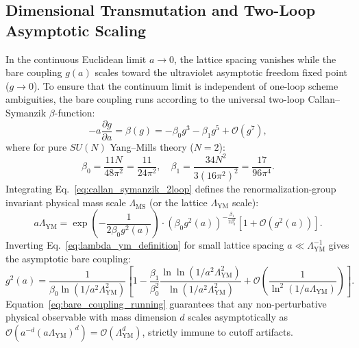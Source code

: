 \documentclass[11pt,reqno]{article}
\begin{document}
\subsection{Dimensional Transmutation and Two-Loop Asymptotic Scaling}
In the continuous Euclidean limit $a \to 0$, the lattice spacing vanishes while the bare coupling $g(a)$ scales toward the ultraviolet asymptotic freedom fixed point ($g \to 0$).
To ensure that the continuum limit is independent of one-loop scheme ambiguities, the bare coupling runs according to the universal two-loop Callan--Symanzik $\beta$-function:
\begin{equation}
    \label{eq:callan_symanzik_2loop}
    -a \frac{\partial g}{\partial a} = \beta(g) = -\beta_0 g^3 - \beta_1 g^5 + \mathcal{O}(g^7),
\end{equation}
where for pure $SU(N)$ Yang--Mills theory ($N=2$):
\begin{equation}
    \label{eq:beta_coefficients}
    \beta_0 = \frac{11 N}{48 \pi^2} = \frac{11}{24 \pi^2}, \quad \beta_1 = \frac{34 N^2}{3 (16 \pi^2)^2} = \frac{17}{96 \pi^4}.
\end{equation}
Integrating Eq.~\eqref{eq:callan_symanzik_2loop} defines the renormalization-group invariant physical mass scale $\Lambda_{\overline{\mathrm{MS}}}$ (or the lattice $\Lambda_{\mathrm{YM}}$ scale):
\begin{equation}
    \label{eq:lambda_ym_definition}
    a \Lambda_{\mathrm{YM}} = \exp\left( -\frac{1}{2 \beta_0 g^2(a)} \right) \cdot \left( \beta_0 g^2(a) \right)^{-\frac{\beta_1}{2 \beta_0^2}} \left[ 1 + \mathcal{O}(g^2(a)) \right].
\end{equation}
Inverting Eq.~\eqref{eq:lambda_ym_definition} for small lattice spacing $a \ll \Lambda_{\mathrm{YM}}^{-1}$ gives the asymptotic bare coupling:
\begin{equation}
    \label{eq:bare_coupling_running}
    g^2(a) = \frac{1}{\beta_0 \ln(1 / a^2 \Lambda_{\mathrm{YM}}^2)} \left[ 1 - \frac{\beta_1}{\beta_0^2} \frac{\ln\ln(1 / a^2 \Lambda_{\mathrm{YM}}^2)}{\ln(1 / a^2 \Lambda_{\mathrm{YM}}^2)} + \mathcal{O}\left( \frac{1}{\ln^2(1/a\Lambda_{\mathrm{YM}})} \right) \right].
\end{equation}
Equation~\eqref{eq:bare_coupling_running} guarantees that any non-perturbative physical observable with mass dimension $d$ scales asymptotically as $\mathcal{O}(a^{-d} (a\Lambda_{\mathrm{YM}})^d) = \mathcal{O}(\Lambda_{\mathrm{YM}}^d)$, strictly immune to cutoff artifacts.
\end{document}
